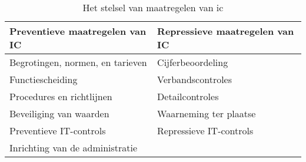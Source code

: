 \begin{table}[h]
    \centering
    \caption{Het stelsel van maatregelen van \gls{ic} \citep{bivpraktijk}}
    \begin{tabular}{l l}
        \toprule
        \textbf{Preventieve maatregelen van IC} & \textbf{Repressieve maatregelen van IC} \\
        \midrule
        Begrotingen, normen, en tarieven & Cijferbeoordeling \\
        Functiescheiding & Verbandscontroles \\
        Procedures en richtlijnen & Detailcontroles \\
        Beveiliging van waarden & Waarneming ter plaatse \\
        Preventieve IT-controls & Repressieve IT-controls \\
        Inrichting van de administratie \\
        \bottomrule
    \end{tabular}
    \label{tab:icmaatregelen2}
\end{table}
